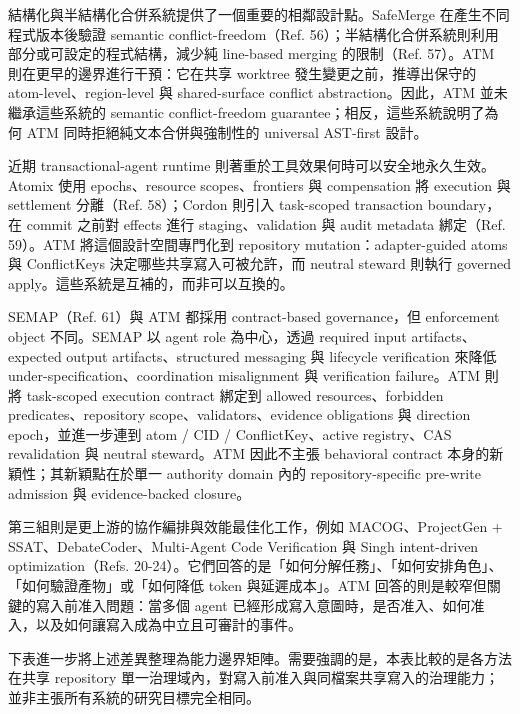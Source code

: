 \documentclass[a4paper,fontset=none]{ctexart}
\begin{document}
結構化與半結構化合併系統提供了一個重要的相鄰設計點。SafeMerge 在產生不同程式版本後驗證 semantic conflict-freedom（Ref. 56）；半結構化合併系統則利用部分或可設定的程式結構，減少純 line-based merging 的限制（Ref. 57）。ATM 則在更早的邊界進行干預：它在共享 worktree 發生變更之前，推導出保守的 atom-level、region-level 與 shared-surface conflict abstraction。因此，ATM 並未繼承這些系統的 semantic conflict-freedom guarantee；相反，這些系統說明了為何 ATM 同時拒絕純文本合併與強制性的 universal AST-first 設計。

近期 transactional-agent runtime 則著重於工具效果何時可以安全地永久生效。Atomix 使用 epochs、resource scopes、frontiers 與 compensation 將 execution 與 settlement 分離（Ref. 58）；Cordon 則引入 task-scoped transaction boundary，在 commit 之前對 effects 進行 staging、validation 與 audit metadata 綁定（Ref. 59）。ATM 將這個設計空間專門化到 repository mutation：adapter-guided atoms 與 ConflictKeys 決定哪些共享寫入可被允許，而 neutral steward 則執行 governed apply。這些系統是互補的，而非可以互換的。

SEMAP（Ref. 61）與 ATM 都採用 contract-based governance，但 enforcement object 不同。SEMAP 以 agent role 為中心，透過 required input artifacts、expected output artifacts、structured messaging 與 lifecycle verification 來降低 under-specification、coordination misalignment 與 verification failure。ATM 則將 task-scoped execution contract 綁定到 allowed resources、forbidden predicates、repository scope、validators、evidence obligations 與 direction epoch，並進一步連到 atom / CID / ConflictKey、active registry、CAS revalidation 與 neutral steward。ATM 因此不主張 behavioral contract 本身的新穎性；其新穎點在於單一 authority domain 內的 repository-specific pre-write admission 與 evidence-backed closure。

第三組則是更上游的協作編排與效能最佳化工作，例如 MACOG、ProjectGen + SSAT、DebateCoder、Multi-Agent Code Verification 與 Singh intent-driven optimization（Refs. 20-24）。它們回答的是「如何分解任務」、「如何安排角色」、「如何驗證產物」或「如何降低 token 與延遲成本」。ATM 回答的則是較窄但關鍵的寫入前准入問題：當多個 agent 已經形成寫入意圖時，是否准入、如何准入，以及如何讓寫入成為中立且可審計的事件。

下表進一步將上述差異整理為能力邊界矩陣。需要強調的是，本表比較的是各方法在共享 repository 單一治理域內，對寫入前准入與同檔案共享寫入的治理能力；並非主張所有系統的研究目標完全相同。

\smallskip{}\par\smallskip
\end{document}
